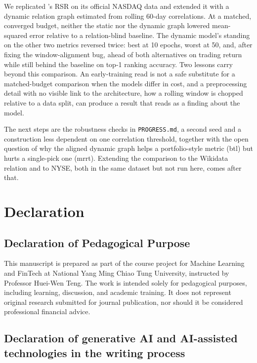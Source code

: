 \documentclass[12pt]{article}
\begin{document}
We replicated \citet{feng2019temporal}'s RSR on its official NASDAQ data and extended it with a
dynamic relation graph estimated from rolling 60-day correlations. At a matched, converged budget,
neither the static nor the dynamic graph lowered mean-squared error relative to a relation-blind
baseline. The dynamic model's standing on the other two metrics reversed twice: best at 10 epochs,
worst at 50, and, after fixing the window-alignment bug, ahead of both alternatives on trading
return while still behind the baseline on top-1 ranking accuracy. Two lessons carry beyond this
comparison. An early-training read is not a safe substitute for a matched-budget comparison when
the models differ in cost, and a preprocessing detail with no visible link to the architecture, how
a rolling window is chopped relative to a data split, can produce a result that reads as a finding
about the model.

The next steps are the robustness checks in \texttt{PROGRESS.md}, a second seed and a construction
less dependent on one correlation threshold, together with the open question of why the aligned
dynamic graph helps a portfolio-style metric (btl) but hurts a single-pick one (mrrt). Extending
the comparison to the Wikidata relation and to NYSE, both in the same dataset but not run here,
comes after that.


\section*{Declaration}

\subsection*{Declaration of Pedagogical Purpose}

This manuscript is prepared as part of the course project for Machine Learning and
FinTech at National Yang Ming Chiao Tung University, instructed by Professor
Huei-Wen Teng. The work is intended solely for pedagogical purposes, including
learning, discussion, and academic training. It does not represent original research
submitted for journal publication, nor should it be considered professional financial
advice.

\subsection*{Declaration of generative AI and AI-assisted technologies in the writing process}
\end{document}
